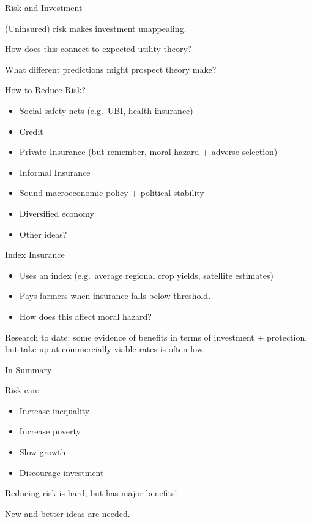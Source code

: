 \documentclass[ignorenonframetext,]{beamer}
\providecommand{\tightlist}{%
  \setlength{\itemsep}{0pt}\setlength{\parskip}{0pt}}
\begin{document}
\begin{frame}{Risk and Investment}
\protect\hypertarget{risk-and-investment}{}

(Uninsured) risk makes investment unappealing.

How does this connect to expected utility theory?

What different predictions might prospect theory make?

\end{frame}

\begin{frame}{How to Reduce Risk?}
\protect\hypertarget{how-to-reduce-risk}{}

\begin{itemize}
\tightlist
\item
  Social safety nets (e.g.~UBI, health insurance)
\item
  Credit
\item
  Private Insurance (but remember, moral hazard + adverse selection)
\item
  Informal Insurance
\item
  Sound macroeconomic policy + political stability
\item
  Diversified economy
\item
  Other ideas?
\end{itemize}

\end{frame}

\begin{frame}{Index Insurance}
\protect\hypertarget{index-insurance}{}

\begin{itemize}
\tightlist
\item
  Uses an index (e.g.~average regional crop yields, satellite estimates)
\item
  Pays farmers when insurance falls below threshold.
\item
  How does this affect moral hazard?
\end{itemize}

Research to date: some evidence of benefits in terms of investment +
protection, but take-up at commercially viable rates is often low.

\end{frame}

\begin{frame}{In Summary}
\protect\hypertarget{in-summary-1}{}

Risk can:

\begin{itemize}
\tightlist
\item
  Increase inequality
\item
  Increase poverty
\item
  Slow growth
\item
  Discourage investment
\end{itemize}

Reducing risk is hard, but has major benefits!

New and better ideas are needed.

\end{frame}
\end{document}
